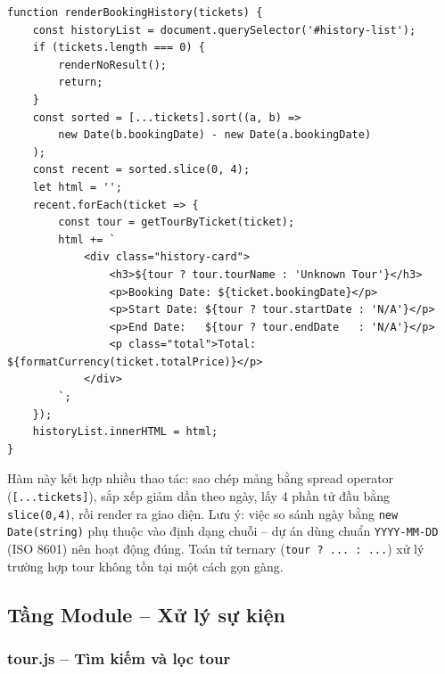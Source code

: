 \documentclass[12pt,a4paper]{article}
\begin{document}
\begin{lstlisting}[caption={customerUi.js -- Render lịch sử đặt tour}]
function renderBookingHistory(tickets) {
    const historyList = document.querySelector('#history-list');
    if (tickets.length === 0) {
        renderNoResult();
        return;
    }
    const sorted = [...tickets].sort((a, b) =>
        new Date(b.bookingDate) - new Date(a.bookingDate)
    );
    const recent = sorted.slice(0, 4);
    let html = '';
    recent.forEach(ticket => {
        const tour = getTourByTicket(ticket);
        html += `
            <div class="history-card">
                <h3>${tour ? tour.tourName : 'Unknown Tour'}</h3>
                <p>Booking Date: ${ticket.bookingDate}</p>
                <p>Start Date: ${tour ? tour.startDate : 'N/A'}</p>
                <p>End Date:   ${tour ? tour.endDate   : 'N/A'}</p>
                <p class="total">Total: ${formatCurrency(ticket.totalPrice)}</p>
            </div>
        `;
    });
    historyList.innerHTML = html;
}
\end{lstlisting}

Hàm này kết hợp nhiều thao tác: sao chép mảng bằng spread operator (\texttt{[...tickets]}), sắp xếp giảm dần theo ngày, lấy 4 phần tử đầu bằng \texttt{slice(0,4)}, rồi render ra giao diện. Lưu ý: việc so sánh ngày bằng \texttt{new Date(string)} phụ thuộc vào định dạng chuỗi -- dự án dùng chuẩn \texttt{YYYY-MM-DD} (ISO 8601) nên hoạt động đúng. Toán tử ternary (\texttt{tour ? ... : ...}) xử lý trường hợp tour không tồn tại một cách gọn gàng.

\subsection{Tầng Module -- Xử lý sự kiện}

\subsubsection{tour.js -- Tìm kiếm và lọc tour}
\end{document}
